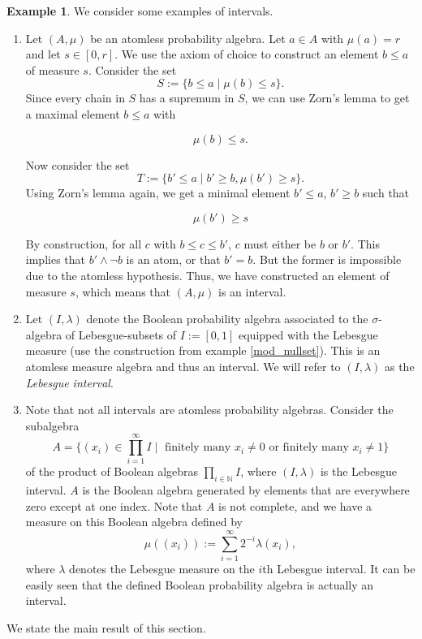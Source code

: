 \documentclass[a4paper]{amsproc}
\theoremstyle{plain}
\theoremstyle{definition}
\newtheorem{example}[theorem]{Example}
\theoremstyle{remark}
\numberwithin{equation}{section}
\begin{document}
\begin{example} \label{interval_examples} We consider some examples of intervals.
\begin{enumerate}
\item Let $(A,\mu)$ be an atomless probability algebra. Let $a \in A$ with $\mu(a) = r$ and let $s \in [0,r]$. We use the axiom of choice to construct an element $b
\leq a$ of measure $s$. Consider the set
\[
S := \{ b \leq a \mid \mu(b) \leq s \}.
\]
Since every chain in $S$ has a supremum in $S$, we can use Zorn's lemma to get a maximal element $b \leq a$ with

\[
    \mu(b) \leq s .
\]

Now consider the set
\[
T := \{ b' \leq a \mid b' \geq b, \mu(b') \geq s\} .
\]
Using Zorn's lemma again, we get a minimal element $b' \leq a$, $b' \geq b$ such that

\[
    \mu(b') \geq s
\]

By construction, for all $c$ with $b \leq c \leq b'$, $c$ must either be $b$ or $b'$. This implies that $b' \wedge \neg b$ is an atom, or that $b' = b$. But the former is impossible due to the atomless hypothesis. Thus, we have constructed an element of measure $s$, which means that $(A,\mu)$ is an interval.
\item Let $(I,\lambda)$ denote the Boolean probability algebra associated to the $\sigma$-algebra of Lebesgue-subsets of $I := [0,1]$ equipped with the Lebesgue measure (use the construction from example \ref{mod_nullset}). This is an atomless measure algebra and thus an interval. We will refer to $(I, \lambda)$ as the \emph{Lebesgue interval}.
\item Note that not all intervals are atomless probability algebras. Consider the subalgebra
\[
A = \{(x_i) \in \prod_{i=1}^{\infty} I \mid \text{ finitely many } x_i \neq 0 \text{ or finitely many } x_i \neq 1 \}
\]
of the product of Boolean algebras $\prod_{i \in \mathbb{N}} I$, where $(I, \lambda)$ is the Lebesgue interval. $A$ is the Boolean algebra generated by elements that are everywhere zero except at one index. Note that $A$ is not complete, and we have a measure on this Boolean algebra defined by
\[
\mu((x_i)) := \sum_{i=1}^{\infty} 2^{-i} \lambda(x_i) ,
\]
where $\lambda$ denotes the Lebesgue measure on the $i$th Lebesgue interval. It can be easily seen that the defined Boolean probability algebra is actually an interval.
\end{enumerate}
\end{example}

We state the main result of this section.
\end{document}
